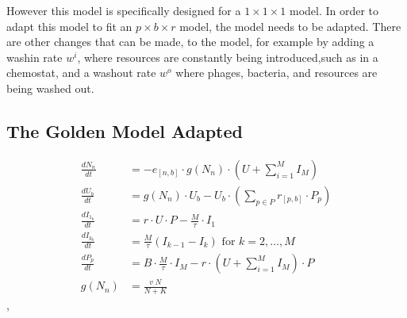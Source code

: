 However this model is specifically designed for a $1\times 1 \times 1$ model. 
In order to adapt this model to fit an $p \times b \times r$ model, the model needs to be adapted. 
There are other changes that can be made, to the model, for example by adding a washin rate $w^{i}$, where resources are constantly being introduced,such as in a chemostat, and a washout rate $w^{o}$ where phages, bacteria, and resources are being washed out. 

\subsection{The Golden Model Adapted}
\begin{align}
    \frac{dN_n}{dt} &= -e_{[n, b]} \cdot g(N_n)\cdot (U + \sum_{i=1}^{M} I_M)\\
    \frac{dU_b}{dt} &= g(N_n)\cdot U_b - U_b \cdot (\sum_{p \in P} r_{[p, b]} \cdot P_p)\\
    \frac{dI_{1_b}}{dt} &= r\cdot U \cdot P - \frac{M}{\tau}\cdot I_1 \\
    \frac{dI_{k_b}}{dt} &= \frac{M}{\tau}(I_{k-1}-I_k) \text{ for } k=2, \dots, M \\
    \frac{dP_p}{dt} &= B\cdot\frac{M}{\tau} \cdot I_M - r\cdot(U + \sum_{i=1}^{M} I_M)\cdot P \\
    g(N_n) &= \frac{v_\cdot N}{N + K}
\end{align},